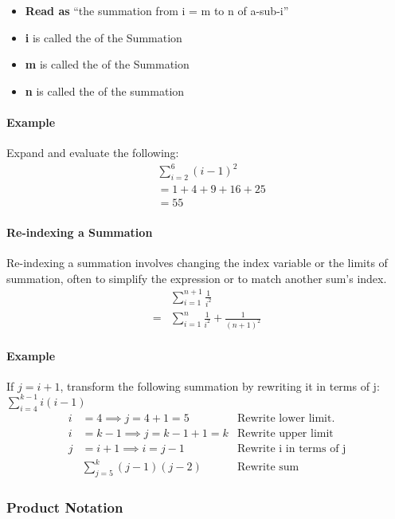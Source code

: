 \begin{itemize}
    \item \textbf{Read as} ``the summation from i = m to n of a-sub-i''
    \item \textbf{i} is called the  of the Summation
    \item \textbf{m} is called the  of the Summation
    \item \textbf{n} is called the  of the summation
\end{itemize}

\paragraph*{Example}
Expand and evaluate the following:
\begin{align*}
    &\sum_{i=2}^6 (i-1)^2\\
    &= 1 + 4 + 9 + 16 + 25\\
    &= 55
\end{align*}

\paragraph*{Re-indexing a Summation}
Re-indexing a summation involves changing the index variable or the limits of summation, often to simplify the expression or to match 
another sum's index.
\begin{align*}
    &\sum_{i=1}^{n+1} \frac{1}{i^2}\\
    = &\sum_{i=1}^{n} \frac{1}{i^2} + \frac{1}{(n+1)^2}
\end{align*}

\paragraph*{Example}
If $j=i+1$, transform the following summation by rewriting it in terms of j: $\sum_{i=4}^{k-1} i(i-1)$
\begin{align*}
    i &= 4 \implies j = 4 + 1 = 5 & \text{Rewrite lower limit.}\\
    i &= k - 1 \implies j = k - 1 + 1 = k & \text{Rewrite upper limit}\\
    j &= i + 1 \implies i = j - 1 & \text{Rewrite i in terms of j}\\
    & \sum_{j=5}^{k} (j-1)(j-2) & \text{Rewrite sum}
\end{align*}

\subsubsection{Product Notation}

